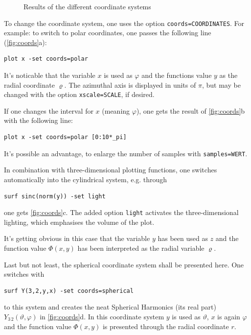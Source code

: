 \documentclass[DIV=14,headsepline,footsepline]{scrbook}
\begin{document}
\begin{figure}[htb]
					\caption{Results of the different coordinate systems}
					\label{fig:coords}
				\end{figure}
				
				To change the coordinate system, one uses the option \lstinline+coords=COORDINATES+. For example: to switch to polar coordinates, one passes the following line (\autoref{fig:coords}a):
				\begin{lstlisting}
plot x -set coords=polar
				\end{lstlisting}
				
				It's noticable that the variable $x$ is used as $\varphi$ and the functions value $y$ as the radial coordinate $\varrho$. The azimuthal axis is displayed in units of $\pi$, but may be changed with the option \lstinline+xscale=SCALE+, if desired. 
				
				If one changes the interval for $x$ (meaning $\varphi$), one gets the result of \autoref{fig:coords}b with the following line:
				\begin{lstlisting}
plot x -set coords=polar [0:10*_pi]
				\end{lstlisting}
				It's possible an advantage, to enlarge the number of samples with \lstinline+samples=WERT+.
				
				In combination with three-dimensional plotting functions, one switches automatically into the cylindrical system, e.g. through
				\begin{lstlisting}
surf sinc(norm(y)) -set light
				\end{lstlisting}
				one gets \autoref{fig:coords}c. The added option \lstinline+light+ activates the three-dimensional lighting, which emphasises the volume of the plot.
				
				It's getting obvious in this case that the variable $y$ has been used as $z$ and the function value $\Phi(x,y)$ has been interpreted as the radial variable $\varrho$.
				
				Last but not least, the spherical coordinate system shall be presented here. One switches with
				\begin{lstlisting}
surf Y(3,2,y,x) -set coords=spherical
				\end{lstlisting}
				to this system and creates the neat Spherical Harmonics (its real part) $Y_{3\,2}(\vartheta,\varphi)$ in \autoref{fig:coords}d. In this coordinate system $y$ is used as $\vartheta$, $x$ is again $\varphi$ and the function value $\Phi(x,y)$ is presented through the radial coordinate $r$.
				
\end{document}
